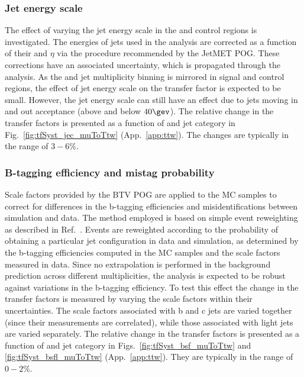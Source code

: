 \subsubsection{Jet energy scale}
\label{sec:tfSyst_jec}

The effect of varying the jet energy scale in the \mj and \mmj control
regions is investigated.  The energies of jets used in the analysis
are corrected as a function of their \pt and $\eta$ via the procedure
recommended by the JetMET POG. These corrections have an associated
uncertainty, which is propagated through the analysis.  As the \scalht
and jet multiplicity binning is mirrored in signal and control
regions, the effect of jet energy scale on the transfer factor is
expected to be small.  However, the jet energy scale can still have an
effect due to jets moving in and out acceptance (above and below
$40\gev$). The relative change in the transfer factors is presented as
a function of \scalht and jet category in
Fig.~\ref{fig:tfSyst_jec_muToTtw} (App.~\ref{app:ttw}). The changes
are typically in the range of $3-6\%$.

\subsubsection{B-tagging efficiency and mistag probability}
\label{sec:tfSyst_btag}

Scale factors provided by the BTV POG are applied to the MC samples to
correct for differences in the b-tagging efficiencies and
misidentifications between simulation and data.  The method employed
is based on simple event reweighting as described in
Ref.~\cite{btagSFMethods}.  Events are reweighted according to the
probability of obtaining a particular jet configuration in data and
simulation, as determined by the b-tagging efficiencies computed in
the MC samples and the scale factors measured in data.  Since no
extrapolation is performed in the background prediction across
different \nb multiplicities, the analysis is expected to be robust
against variations in the b-tagging efficiency.  To test this effect
the change in the transfer factors is measured by varying the scale
factors within their uncertainties. The scale factors associated with
b and c jets are varied together (since their measurements are
correlated), while those associated with light jets are varied
separately.  The relative change in the transfer factors is presented
as a function of \scalht and jet category in
Figs.~\ref{fig:tfSyst_bsf_muToTtw} and \ref{fig:tfSyst_bsfl_muToTtw}
(App.~\ref{app:ttw}).  They are typically in the range of $0-2\%$.

